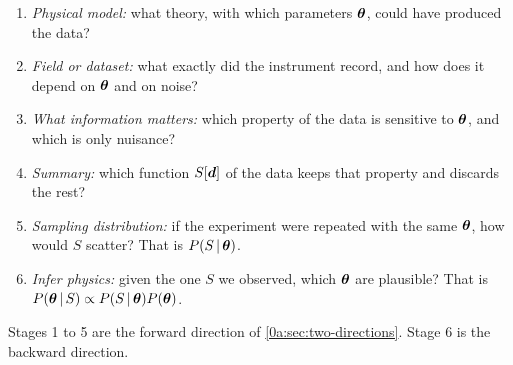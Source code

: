 \begin{enumerate}[leftmargin=2em]
  \item \emph{Physical model:} what theory, with which parameters $\bm{\theta}$, could have produced the data?
  \item \emph{Field or dataset:} what exactly did the instrument record, and how does it depend on $\bm{\theta}$ and on noise?
  \item \emph{What information matters:} which property of the data is sensitive to $\bm{\theta}$, and which is only nuisance?
  \item \emph{Summary:} which function $S[\bm{d}]$ of the data keeps that property and discards the rest?
  \item \emph{Sampling distribution:} if the experiment were repeated with the same $\bm{\theta}$, how would $S$ scatter? That is $P(S\,\vert\,\bm{\theta})$.
  \item \emph{Infer physics:} given the one $S$ we observed, which $\bm{\theta}$ are plausible? That is $P(\bm{\theta}\,\vert\, S)\propto P(S\,\vert\,\bm{\theta})P(\bm{\theta})$.
\end{enumerate}
Stages 1 to 5 are the forward direction of \cref{0a:sec:two-directions}.
Stage 6 is the backward direction.

